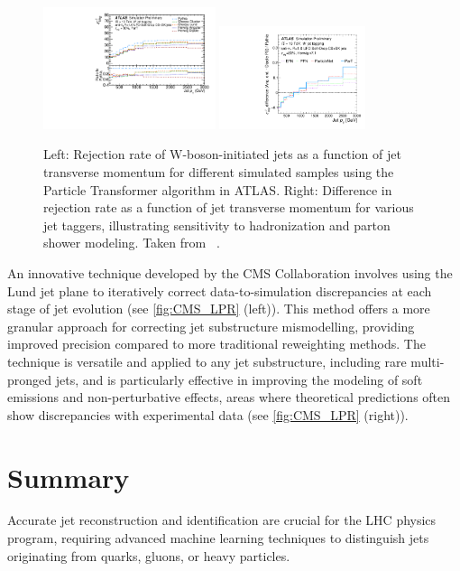 \documentclass[a4paper,11pt]{article}
\begin{document}
\begin{figure}[t]
    \centering
\includegraphics[width=0.45\textwidth]{figure_ATLAS_modelling_mc.pdf}
 \includegraphics[width=0.38\textwidth]{figure_ATLAS_modelling_ps.pdf}
\caption{
Left: Rejection rate of W-boson-initiated jets as a function of jet transverse momentum for different simulated samples using the Particle Transformer algorithm in ATLAS.
Right: Difference in rejection rate as a function of jet transverse momentum for various jet taggers, illustrating sensitivity to hadronization and parton shower modeling. Taken from ~\cite{ATL-PHYS-PUB-2023-020}.
}
    \label{fig:ModellingSimulation}
\end{figure}

An innovative technique developed by the CMS Collaboration involves using the Lund jet plane
to iteratively correct data-to-simulation discrepancies at each stage of jet evolution (see \cref{fig:CMS_LPR} (left)).
This method offers a more granular approach for correcting jet substructure mismodelling,
providing improved precision compared to more traditional reweighting methods.
The technique is versatile and applied to any jet substructure, including rare multi-pronged jets,
and is particularly effective in improving the modeling of soft emissions and non-perturbative effects,
areas where theoretical predictions often show discrepancies with experimental data (see \cref{fig:CMS_LPR} (right)).

\section{Summary}

Accurate jet reconstruction and identification are crucial for the LHC physics program, requiring
advanced machine learning techniques to distinguish jets originating from quarks, gluons, or heavy particles.
\end{document}
